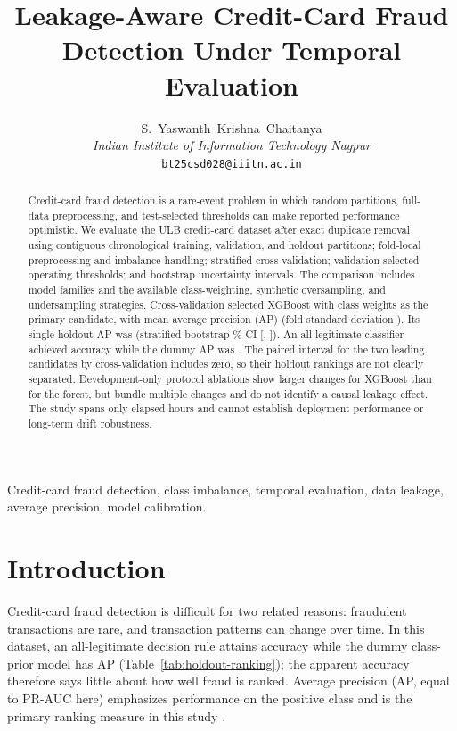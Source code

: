 \documentclass[journal]{IEEEtran}
\title{Leakage-Aware Credit-Card Fraud Detection Under Temporal Evaluation}
\author{S.~Yaswanth~Krishna~Chaitanya\\
\textit{Indian Institute of Information Technology Nagpur}\\
\texttt{bt25csd028@iiitn.ac.in}}
\begin{document}
\maketitle

\begin{abstract}
Credit-card fraud detection is a rare-event problem in which random partitions, full-data preprocessing, and test-selected thresholds can make reported performance optimistic. We evaluate the ULB credit-card dataset after exact duplicate removal using contiguous chronological training, validation, and holdout partitions; fold-local preprocessing and imbalance handling; stratified cross-validation; validation-selected operating thresholds; and bootstrap uncertainty intervals. The comparison includes \ModelFamilyCount{} model families and the available class-weighting, synthetic oversampling, and undersampling strategies. Cross-validation selected XGBoost with class weights as the primary candidate, with mean average precision (AP) \PrimaryCVAP{} (fold standard deviation \CVBestSD{}). Its single holdout AP was \PrimaryHoldoutAP{} (stratified-bootstrap \ConfidenceLevel{}\% CI [\PrimaryHoldoutAPLow{}, \PrimaryHoldoutAPHigh{}]). An all-legitimate classifier achieved accuracy \AllLegitAccuracy{} while the dummy AP was \DummyAP{}. The paired interval for the two leading candidates by cross-validation includes zero, so their holdout rankings are not clearly separated. Development-only protocol ablations show larger changes for XGBoost than for the forest, but bundle multiple changes and do not identify a causal leakage effect. The study spans only \TimeSpanHours{} elapsed hours and cannot establish deployment performance or long-term drift robustness.
\end{abstract}

\begin{IEEEkeywords}
Credit-card fraud detection, class imbalance, temporal evaluation, data leakage, average precision, model calibration.
\end{IEEEkeywords}

\section{Introduction}
\label{sec:introduction}
Credit-card fraud detection is difficult for two related reasons: fraudulent transactions are rare, and transaction patterns can change over time. In this dataset, an all-legitimate decision rule attains accuracy \AllLegitAccuracy{} while the dummy class-prior model has AP \DummyAP{} (Table~\ref{tab:holdout-ranking}); the apparent accuracy therefore says little about how well fraud is ranked. Average precision (AP, equal to PR-AUC here) emphasizes performance on the positive class and is the primary ranking measure in this study \cite{saito2015}.
\end{document}
